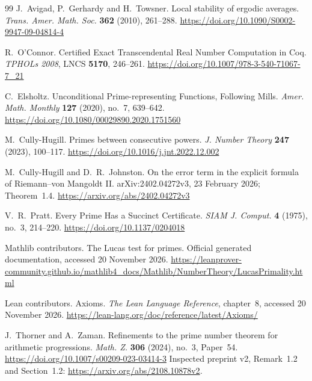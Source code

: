 \documentclass[11pt,reqno]{amsart}
\theoremstyle{blueplain}
\numberwithin{equation}{section}
\def\hyperlink#1#2{#2}}
\begin{document}
\begin{thebibliography}{99}
	\hypertarget{abbr-source:AvigadGerhardyTowsner2010}{}
	J.~Avigad, P.~Gerhardy and H.~Towsner.
	Local stability of ergodic averages.
	\hyperlink{abbr:journal-Trans-Amer-Math-Soc}{\emph{Trans. Amer. Math. Soc.}} \textbf{362} (2010), 261--288.
	\url{https://doi.org/10.1090/S0002-9947-09-04814-4}
	
	\hypertarget{abbr-source:OConnor2008}{}
	R.~O'Connor.
	Certified Exact Transcendental Real Number Computation in Coq.
	\emph{\hyperlink{abbr:TPHOLs}{TPHOLs} 2008}, \hyperlink{abbr:LNCS}{LNCS} \textbf{5170}, 246--261.
	\url{https://doi.org/10.1007/978-3-540-71067-7_21}
	
	C.~Elsholtz.
	Unconditional Prime-representing Functions, Following Mills.
	\hyperlink{abbr:journal-Amer-Math-Monthly}{\emph{Amer. Math. Monthly}} \textbf{127} (2020), no.~7, 639--642.
	\url{https://doi.org/10.1080/00029890.2020.1751560}
	
	\hypertarget{abbr-source:CullyHugill2023}{}
	M.~Cully-Hugill.
	Primes between consecutive powers.
	\hyperlink{abbr:journal-J-Number-Theory}{\emph{J. Number Theory}} \textbf{247} (2023), 100--117.
	\url{https://doi.org/10.1016/j.jnt.2022.12.002}
	
	M.~Cully-Hugill and D.~R.~Johnston.
	On the error term in the explicit formula of Riemann--von Mangoldt II.
	arXiv:2402.04272v3, 23 February 2026; Theorem~1.4.
	\url{https://arxiv.org/abs/2402.04272v3}
	
	\hypertarget{abbr-source:Pratt1975}{}
	V.~R.~Pratt.
	Every Prime Has a Succinct Certificate.
	\hyperlink{abbr:journal-SIAM-J-Comput}{\emph{SIAM J. Comput.}} \textbf{4} (1975), no.~3, 214--220.
	\url{https://doi.org/10.1137/0204018}
	
	Mathlib contributors.
	The Lucas test for primes.
	Official generated documentation, accessed 20 November 2026.
	\url{https://leanprover-community.github.io/mathlib4_docs/Mathlib/NumberTheory/LucasPrimality.html}
	
	Lean contributors.
	Axioms.
	\emph{The Lean Language Reference}, chapter~8,
	accessed 20 November 2026.
	\url{https://lean-lang.org/doc/reference/latest/Axioms/}
	
	\hypertarget{abbr-source:ThornerZaman2024}{}
	J.~Thorner and A.~Zaman.
	Refinements to the prime number theorem for arithmetic progressions.
	\hyperlink{abbr:journal-Math-Z}{\emph{Math. Z.}} \textbf{306} (2024), no.~3, Paper~54.
	\url{https://doi.org/10.1007/s00209-023-03414-3}
	Inspected preprint v2, Remark~1.2 and Section~1.2:
	\url{https://arxiv.org/abs/2108.10878v2}.
	

\end{thebibliography}
\end{document}
